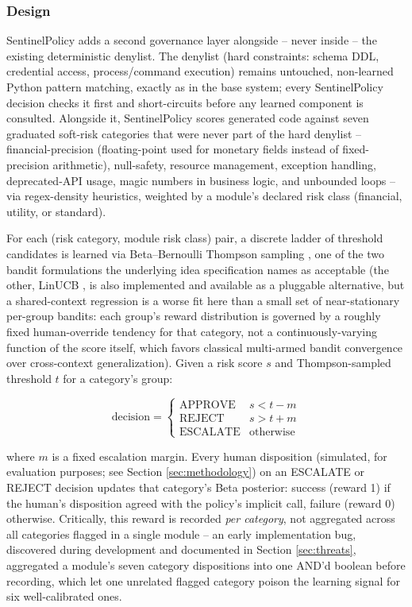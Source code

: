 \documentclass[conference]{IEEEtran}
\begin{document}
\subsubsection{Design}
SentinelPolicy adds a second governance layer alongside -- never inside --
the existing deterministic denylist. The denylist (hard constraints: schema
DDL, credential access, process/command execution) remains untouched,
non-learned Python pattern matching, exactly as in the base system; every
SentinelPolicy decision checks it first and short-circuits before any
learned component is consulted. Alongside it, SentinelPolicy scores generated
code against seven graduated soft-risk categories that were never part of
the hard denylist -- financial-precision (floating-point used for monetary
fields instead of fixed-precision arithmetic), null-safety, resource
management, exception handling, deprecated-API usage, magic numbers in
business logic, and unbounded loops -- via regex-density heuristics, weighted
by a module's declared risk class (financial, utility, or standard).

For each (risk category, module risk class) pair, a discrete ladder of
threshold candidates is learned via Beta--Bernoulli Thompson sampling
\cite{thompson1933, thompsontutorial}, one of the two bandit formulations the
underlying idea specification names as acceptable (the other, LinUCB
\cite{linucb}, is also implemented and available as a pluggable alternative,
but a shared-context regression is a worse fit here than a small set of
near-stationary per-group bandits: each group's reward distribution is
governed by a roughly fixed human-override tendency for that category, not a
continuously-varying function of the score itself, which favors classical
multi-armed bandit convergence over cross-context generalization). Given a
risk score $s$ and Thompson-sampled threshold $t$ for a category's group:

\begin{equation}
\text{decision} =
\begin{cases}
\text{APPROVE} & s < t - m \\
\text{REJECT} & s > t + m \\
\text{ESCALATE} & \text{otherwise}
\end{cases}
\end{equation}

\noindent where $m$ is a fixed escalation margin. Every human disposition
(simulated, for evaluation purposes; see Section \ref{sec:methodology}) on
an ESCALATE or REJECT decision updates that category's Beta posterior:
success (reward 1) if the human's disposition agreed with the policy's
implicit call, failure (reward 0) otherwise. Critically, this reward is
recorded \emph{per category}, not aggregated across all categories flagged
in a single module -- an early implementation bug, discovered during
development and documented in Section \ref{sec:threats}, aggregated a
module's seven category dispositions into one AND'd boolean before
recording, which let one unrelated flagged category poison the learning
signal for six well-calibrated ones.
\end{document}
